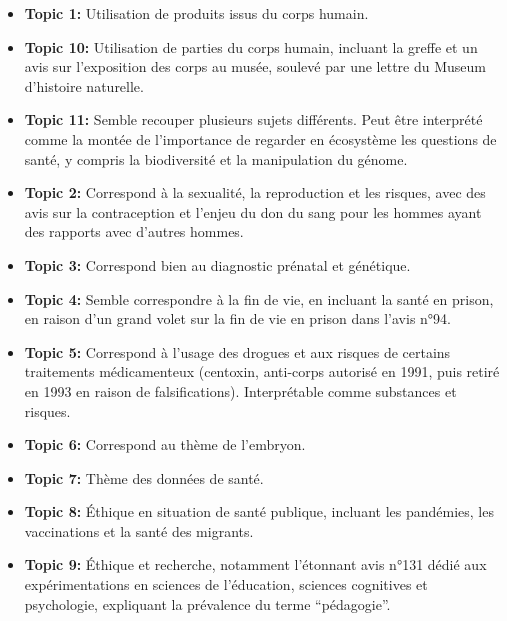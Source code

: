 \documentclass[
  letterpaper,
  DIV=11,
  numbers=noendperiod]{scrartcl}
\begin{document}
\begin{itemize}
\item
  \textbf{Topic 1:} Utilisation de produits issus du corps humain.
\item
  \textbf{Topic 10:} Utilisation de parties du corps humain, incluant la
  greffe et un avis sur l'exposition des corps au musée, soulevé par une
  lettre du Museum d'histoire naturelle.
\item
  \textbf{Topic 11:} Semble recouper plusieurs sujets différents. Peut
  être interprété comme la montée de l'importance de regarder en
  écosystème les questions de santé, y compris la biodiversité et la
  manipulation du génome.
\item
  \textbf{Topic 2:} Correspond à la sexualité, la reproduction et les
  risques, avec des avis sur la contraception et l'enjeu du don du sang
  pour les hommes ayant des rapports avec d'autres hommes.
\item
  \textbf{Topic 3:} Correspond bien au diagnostic prénatal et génétique.
\item
  \textbf{Topic 4:} Semble correspondre à la fin de vie, en incluant la
  santé en prison, en raison d'un grand volet sur la fin de vie en
  prison dans l'avis n°94.
\item
  \textbf{Topic 5:} Correspond à l'usage des drogues et aux risques de
  certains traitements médicamenteux (centoxin, anti-corps autorisé en
  1991, puis retiré en 1993 en raison de falsifications). Interprétable
  comme substances et risques.
\item
  \textbf{Topic 6:} Correspond au thème de l'embryon.
\item
  \textbf{Topic 7:} Thème des données de santé.
\item
  \textbf{Topic 8:} Éthique en situation de santé publique, incluant les
  pandémies, les vaccinations et la santé des migrants.
\item
  \textbf{Topic 9:} Éthique et recherche, notamment l'étonnant avis
  n°131 dédié aux expérimentations en sciences de l'éducation, sciences
  cognitives et psychologie, expliquant la prévalence du terme
  ``pédagogie''.
\end{itemize}
\end{document}
